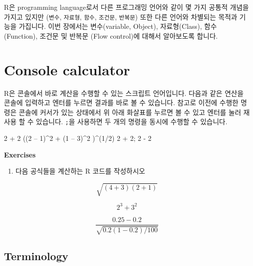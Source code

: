 \documentclass[
  a4paper,
]{book}
\newenvironment{Shaded}{\begin{snugshade}}{\end{snugshade}}
\newcommand{\DecValTok}[1]{\textcolor[rgb]{0.68,0.00,0.00}{#1}}
\newcommand{\NormalTok}[1]{\textcolor[rgb]{0.00,0.23,0.31}{#1}}
\newcommand{\SpecialCharTok}[1]{\textcolor[rgb]{0.37,0.37,0.37}{#1}}
\providecommand{\tightlist}{%
  \setlength{\itemsep}{0pt}\setlength{\parskip}{0pt}}\usepackage{longtable,booktabs,array}
\begin{document}
R은 programming language로서 다른 프로그래밍 언어와 같이 몇 가지 공통적
개념을 가지고 있지만 (\texttt{변수}, \texttt{자료형}, \texttt{함수},
\texttt{조건문}, \texttt{반복문}) 또한 다른 언어와 차별되는 목적과
기능을 가집니다. 이번 장에서는 변수(variable, Object), 자료형(Class),
함수(Function), 조건문 및 반복문 (Flow control)에 대해서 알아보도록
합니다.

\hypertarget{console-calculator}{%
\section{Console calculator}\label{console-calculator}}

R은 콘솔에서 바로 계산을 수행할 수 있는 스크립트 언어입니다. 다음과 같은
연산을 콘솔에 입력하고 엔터를 누르면 결과를 바로 볼 수 있습니다. 참고로
이전에 수행한 명령은 콘솔에 커서가 있는 상태에서 위 아래 화살표를 누르면
볼 수 있고 엔터를 눌러 재사용 할 수 있습니다. \texttt{;}을 사용하면 두
개의 명령을 동시에 수행할 수 있습니다.

\begin{Shaded}
\begin{Highlighting}[]
\DecValTok{2} \SpecialCharTok{+} \DecValTok{2}
\NormalTok{((}\DecValTok{2}\NormalTok{ – }\DecValTok{1}\NormalTok{)}\SpecialCharTok{\^{}}\DecValTok{2} \SpecialCharTok{+}\NormalTok{ (}\DecValTok{1}\NormalTok{ – }\DecValTok{3}\NormalTok{)}\SpecialCharTok{\^{}}\DecValTok{2}\NormalTok{ )}\SpecialCharTok{\^{}}\NormalTok{(}\DecValTok{1}\SpecialCharTok{/}\DecValTok{2}\NormalTok{)}
\DecValTok{2} \SpecialCharTok{+} \DecValTok{2}\NormalTok{; }\DecValTok{2} \SpecialCharTok{{-}} \DecValTok{2}
\end{Highlighting}
\end{Shaded}

\textbf{Exercises}

\begin{enumerate}
\def\labelenumi{\arabic{enumi})}
\tightlist
\item
  다음 공식들을 계산하는 R 코드를 작성하시오
\end{enumerate}

\[ \sqrt{(4+3)(2+1)} \]

\[ 2^3 + 3^2 \]

\[ \frac{0.25 - 0.2}{\sqrt{0.2 (1-0.2)/100}}\]

\hypertarget{terminology}{%
\subsection{Terminology}\label{terminology}}
\end{document}
